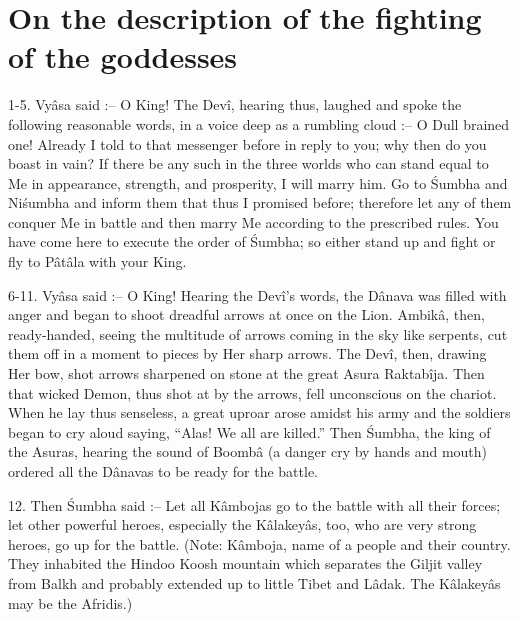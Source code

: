 ﻿\chapter{On the description of the fighting of the goddesses}

1-5. Vy\^asa said :-- O King! The Dev\^i, hearing thus, laughed and spoke the following reasonable words, in a voice deep as a rumbling cloud :-- O Dull brained one! Already I told to that messenger before in reply to you; why then do you boast in vain? If there be any such in the three worlds who can stand equal to Me in appearance, strength, and prosperity, I will marry him. Go to \'Sumbha and Ni\'sumbha and inform them that thus I promised before; therefore let any of them conquer Me in battle and then marry Me according to the prescribed rules. You have come here to execute the order of \'Sumbha; so either stand up and fight or fly to P\^at\^ala with your King.

6-11. Vy\^asa said :-- O King! Hearing the Dev\^i's words, the D\^anava was filled with anger and began to shoot dreadful arrows at once on the Lion. Ambik\^a, then, ready-handed, seeing the multitude of arrows coming in the sky like serpents, cut them off in a moment to pieces by Her sharp arrows. The Dev\^i, then, drawing Her bow, shot arrows sharpened on stone at the great Asura Raktab\^ija. Then that wicked Demon, thus shot at by the arrows, fell unconscious on the chariot. When he lay thus senseless, a great uproar arose amidst his army and the soldiers began to cry aloud saying, ``Alas! We all are killed.'' Then \'Sumbha, the king of the Asuras, hearing the sound of Boomb\^a (a danger cry by hands and mouth) ordered all the D\^anavas to be ready for the battle.

12. Then \'Sumbha said :-- Let all K\^ambojas go to the battle with all their forces; let other powerful heroes, especially the K\^alakey\^as, too, who are very strong heroes, go up for the battle. (Note: K\^amboja, name of a people and their country. They inhabited the Hindoo Koosh mountain which separates the Giljit valley from Balkh and probably extended up to little Tibet and L\^adak. The K\^alakey\^as may be the Afridis.)

